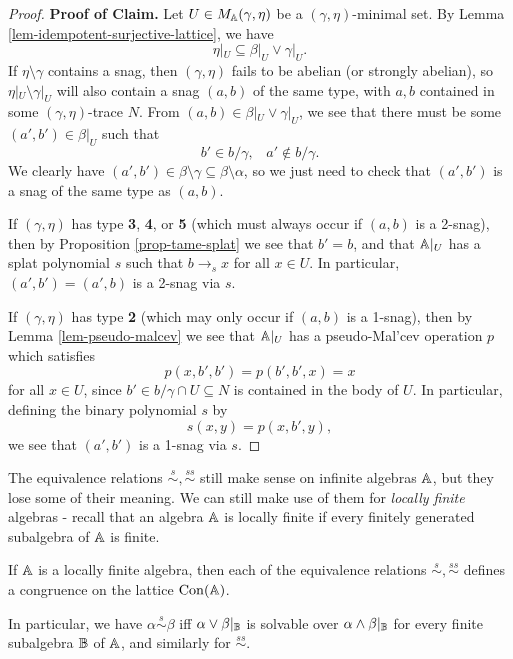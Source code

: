 \begin{appendices}
\begin{proof}
{\bf Proof of Claim.} Let $U \in M_{\mathbb{A}}(\gamma, \eta)$ be a $(\gamma, \eta)$-minimal set. By Lemma \ref{lem-idempotent-surjective-lattice}, we have
\[
\eta|_U \subseteq \beta|_U \vee \gamma|_U.
\]
If $\eta \setminus \gamma$ contains a snag, then $(\gamma, \eta)$ fails to be abelian (or strongly abelian), so $\eta|_U \setminus \gamma|_U$ will also contain a snag $(a,b)$ of the same type, with $a,b$ contained in some $(\gamma, \eta)$-trace $N$. From $(a,b) \in \beta|_U \vee \gamma|_U$, we see that there must be some $(a', b') \in \beta|_U$ such that
\[
b' \in b/\gamma, \;\;\; a' \not\in b/\gamma.
\]
We clearly have $(a',b') \in \beta \setminus \gamma \subseteq \beta \setminus \alpha$, so we just need to check that $(a',b')$ is a snag of the same type as $(a,b)$.

If $(\gamma, \eta)$ has type \textbf{3}, \textbf{4}, or \textbf{5} (which must always occur if $(a,b)$ is a 2-snag), then by Proposition \ref{prop-tame-splat} we see that $b' = b$, and that $\mathbb{A}|_U$ has a splat polynomial $s$ such that $b \rightarrow_s x$ for all $x \in U$. In particular, $(a',b') = (a',b)$ is a 2-snag via $s$.

If $(\gamma, \eta)$ has type \textbf{2} (which may only occur if $(a,b)$ is a 1-snag), then by Lemma \ref{lem-pseudo-malcev} we see that $\mathbb{A}|_U$ has a pseudo-Mal'cev operation $p$ which satisfies
\[
p(x,b',b') = p(b',b',x) = x
\]
for all $x \in U$, since $b' \in b/\gamma \cap U \subseteq N$ is contained in the body of $U$. In particular, defining the binary polynomial $s$ by
\[
s(x,y) = p(x,b',y),
\]
we see that $(a',b')$ is a 1-snag via $s$.
\end{proof}

The equivalence relations $\stackrel{s}{\sim}, \stackrel{ss}{\sim}$ still make sense on infinite algebras $\mathbb{A}$, but they lose some of their meaning. We can still make use of them for \emph{locally finite} algebras - recall that an algebra $\mathbb{A}$ is locally finite if every finitely generated subalgebra of $\mathbb{A}$ is finite.

\begin{cor} If $\mathbb{A}$ is a locally finite algebra, then each of the equivalence relations $\stackrel{s}{\sim}, \stackrel{ss}{\sim}$ defines a congruence on the lattice $\operatorname{Con}(\mathbb{A})$.

In particular, we have $\alpha \stackrel{s}{\sim} \beta$ iff $\alpha \vee \beta|_{\mathbb{B}}$ is solvable over $\alpha \wedge \beta|_{\mathbb{B}}$ for every finite subalgebra $\mathbb{B}$ of $\mathbb{A}$, and similarly for $\stackrel{ss}{\sim}$.
\end{cor}


\end{appendices}
